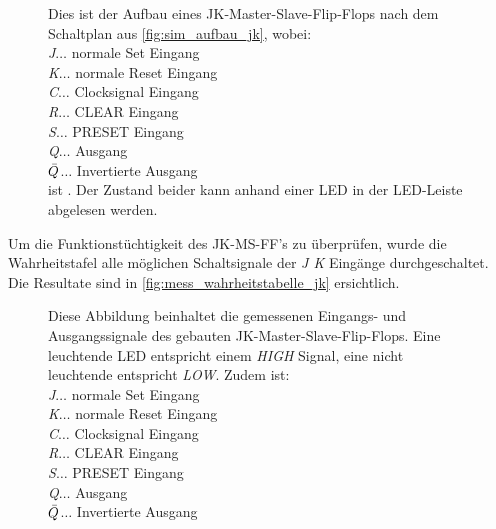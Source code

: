 \documentclass[12pt,english,ngerman]{scrartcl}
\begin{document}
\begin{figure}[H]
  \centering
  \caption{Dies ist der Aufbau eines JK-Master-Slave-Flip-Flops nach dem
  Schaltplan aus \autoref{fig:sim_aufbau_jk}, wobei:\\
    \textit{J}$\dots$ normale Set Eingang\\
    \textit{K}$\dots$ normale Reset Eingang\\
    \textit{C}$\dots$ Clocksignal Eingang\\
    \textit{R}$\dots$ CLEAR Eingang\\
    \textit{S}$\dots$ PRESET Eingang\\
    \textit{Q}$\dots$ Ausgang\\
    \textit{$\Bar{Q}$}$\dots$ Invertierte Ausgang\\
ist . Der Zustand
  beider kann anhand einer LED in der LED-Leiste abgelesen werden.}
  \label{fig:mess_aufbau_jk}
\end{figure}


Um die Funktionstüchtigkeit des JK-MS-FF's zu überprüfen, wurde die
Wahrheitstafel alle möglichen Schaltsignale der \textit{J K} Eingänge
durchgeschaltet. Die Resultate sind in \autoref{fig:mess_wahrheitstabelle_jk}
ersichtlich.

\begin{figure}[H]
  \centering
  \caption{Diese Abbildung beinhaltet die gemessenen Eingangs- und
  Ausgangssignale des gebauten JK-Master-Slave-Flip-Flops. Eine leuchtende
  LED entspricht einem \textit{HIGH} Signal, eine nicht leuchtende entspricht
  \textit{LOW}. Zudem ist:\\ 
    \textit{J}$\dots$ normale Set Eingang\\
    \textit{K}$\dots$ normale Reset Eingang\\
    \textit{C}$\dots$ Clocksignal Eingang\\
    \textit{R}$\dots$ CLEAR Eingang\\
    \textit{S}$\dots$ PRESET Eingang\\
    \textit{Q}$\dots$ Ausgang\\
  \textit{$\Bar{Q}$}$\dots$ Invertierte Ausgang}
\label{fig:mess_wahrheitstabelle_jk}
\end{figure}
\end{document}
